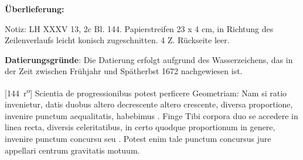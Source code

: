       
               
                \begin{ledgroupsized}[r]{120mm}
                \footnotesize 
                \pstart                
                \noindent\textbf{\"{U}berlieferung:}   
                \pend
                \end{ledgroupsized}
            
              
                            \begin{ledgroupsized}[r]{114mm}
                            \footnotesize 
                            \pstart \parindent -6mm
                            Notiz: LH XXXV 13, 2c Bl. 144. Papierstreifen 23 x 4 cm, in Richtung des Zeilenverlaufs leicht konisch zugeschnitten. 4  Z. R\"{u}ckseite leer. \pend
                            \end{ledgroupsized}
                \vspace*{5mm}
                \begin{ledgroup}
                \footnotesize 
                \pstart
            \noindent\footnotesize{\textbf{Datierungsgr\"{u}nde}: Die Datierung erfolgt aufgrund des Wasserzeichens, das in der Zeit zwischen Fr\"{u}hjahr und Sp\"{a}therbst 1672 nachgewiesen ist.}
                \pend
                \end{ledgroup}
            
                \vspace*{8mm}
                \pstart 
                \normalsize
            [144~r\textsuperscript{o}] Scientia de progressionibus potest perficere Geometriam: Nam si ratio invenietur, datis duobus altero decrescente altero crescente, diversa proportione, invenire punctum aequalitatis, habebimus . Finge Tibi corpora duo se accedere in linea recta, diversis celeritatibus, in certo quodque  proportionum in genere, invenire punctum concursu seu \protect{}. Potest enim tale punctum concursus\protect{} jure appellari centrum gravitatis motuum.\pend 
 


 

